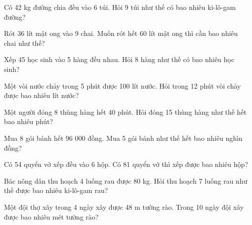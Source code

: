 \begin{ex}
Có 42 kg đường chia đều vào 6 túi. Hỏi 9 túi như thế có bao nhiêu ki-lô-gam đường?
\end{ex}

\begin{ex}
Rót 36 lít mật ong vào 9 chai. Muốn rót hết 60 lít mật ong thì cần bao nhiêu chai như thế?
\end{ex}

\begin{ex}
Xếp 45 học sinh vào 5 hàng đều nhau. Hỏi 8 hàng như thế có bao nhiêu học sinh?
\end{ex}

\begin{ex}
Một vòi nước chảy trong 5 phút được 100 lít nước. Hỏi trong 12 phút vòi chảy được bao nhiêu lít nước?
\end{ex}

\begin{ex}
Một người đóng 8 thùng hàng hết 40 phút. Hỏi đóng 15 thùng hàng như thế hết bao nhiêu phút?
\end{ex}

\begin{ex}
Mua 8 gói bánh hết 96 000 đồng. Mua 5 gói bánh như thế hết bao nhiêu nghìn đồng?
\end{ex}

\begin{ex}
Có 54 quyển vở xếp đều vào 6 hộp. Có 81 quyển vở thì xếp được bao nhiêu hộp?
\end{ex}

\begin{ex}
Bác nông dân thu hoạch 4 luống rau được 80 kg. Hỏi thu hoạch 7 luống rau như thế được bao nhiêu ki-lô-gam rau?
\end{ex}

\begin{ex}
Một đội thợ xây trong 4 ngày xây được 48 m tường rào. Trong 10 ngày đội xây được bao nhiêu mét tường rào?
\end{ex}


